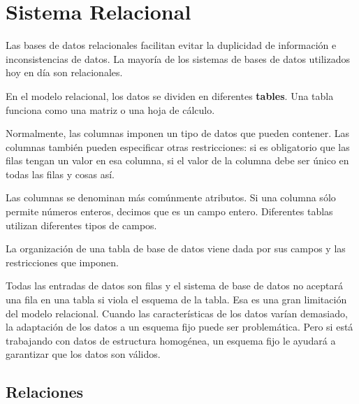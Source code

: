 \documentclass[12pt, fleqn]{report}                             %
\begin{document}
        \clearpage
        \section{Sistema Relacional}

            Las bases de datos relacionales facilitan evitar la duplicidad de información
            e inconsistencias de datos.
            La mayoría de los sistemas de bases de datos utilizados hoy en día son relacionales.

            En el modelo relacional, los datos se dividen en diferentes \textbf{tables}.
            Una tabla funciona como una matriz o una hoja de cálculo.

            Normalmente, las columnas imponen un tipo de datos que pueden contener.
            Las columnas también pueden especificar otras restricciones: si es obligatorio que las
            filas tengan un valor en esa columna, si el valor de la columna debe ser único en todas
            las filas y cosas así.

            Las columnas se denominan más comúnmente atributos.
            Si una columna sólo permite números enteros, decimos que es un campo entero.
            Diferentes tablas utilizan diferentes tipos de campos.

            La organización de una tabla de base de datos viene dada por sus campos y las
            restricciones que imponen.

            Todas las entradas de datos son filas y el sistema de base de datos no aceptará
            una fila en una tabla si viola el esquema de la tabla. Esa es una gran limitación
            del modelo relacional.
            Cuando las características de los datos varían demasiado, la adaptación de los datos
            a un esquema fijo puede ser problemática. Pero si está trabajando con datos de
            estructura homogénea, un esquema fijo le ayudará a garantizar que los datos son válidos.



            \clearpage
            \subsection{Relaciones}
\end{document}
